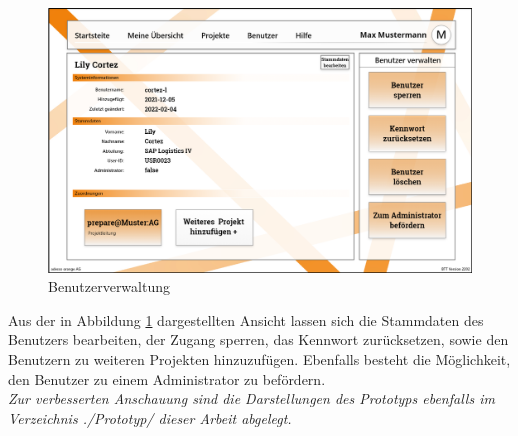 \begin{figure}[h!]
    \centering
    \includegraphics[scale=0.35]{./Prototyp/043_Benutzer verwalten.png}
    \caption[Prototyp: Benutzerverwaltung]{Benutzerverwaltung}
    \label{fig:Benutzerverwaltung}
\end{figure}
Aus der in Abbildung \ref{fig:Benutzerverwaltung} dargestellten Ansicht lassen sich die Stammdaten des Benutzers bearbeiten, der Zugang sperren, das Kennwort zurücksetzen, sowie den Benutzern zu weiteren Projekten hinzuzufügen. Ebenfalls besteht die Möglichkeit, den Benutzer zu einem Administrator zu befördern.
\vspace{2em}
\\\emph{Zur verbesserten Anschauung sind die Darstellungen des Prototyps ebenfalls im Verzeichnis ./Prototyp/ dieser Arbeit abgelegt.}